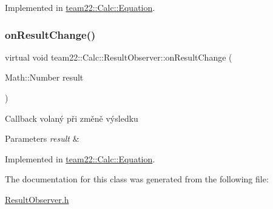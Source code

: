 Implemented in \hyperlink{classteam22_1_1_calc_1_1_equation_a4e7a0614867931bcc714440441cdd894}{team22\+::\+Calc\+::\+Equation}.

\mbox{\label{classteam22_1_1_calc_1_1_result_observer_aa04007df3aa8a499c3a511f549238285}} 
\subsubsection{\texorpdfstring{on\+Result\+Change()}{onResultChange()}}
{\footnotesize\ttfamily virtual void team22\+::\+Calc\+::\+Result\+Observer\+::on\+Result\+Change (\begin{DoxyParamCaption}\item[{Math\+::\+Number}]{result }\end{DoxyParamCaption})\hspace{0.3cm}{\ttfamily [pure virtual]}}

Callback volaný při změně výsledku 
\begin{DoxyParams}{Parameters}
{\em result} & \\
\hline
\end{DoxyParams}


Implemented in \hyperlink{classteam22_1_1_calc_1_1_equation_a302c295e099f589897a1bad4b02d3de8}{team22\+::\+Calc\+::\+Equation}.



The documentation for this class was generated from the following file\+:\begin{DoxyCompactItemize}
\item 
\hyperlink{_result_observer_8h}{Result\+Observer.\+h}\end{DoxyCompactItemize}

